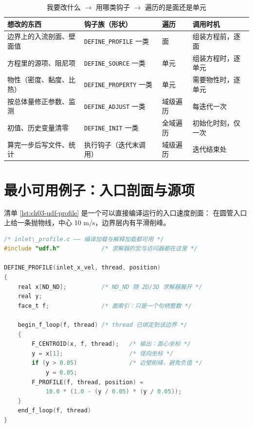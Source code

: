 \documentclass[12pt,a4paper,fontset=fandol]{ctexbook}
\newcommand{\Tp}[1]{\texttt{#1}}
\newcommand{\Bk}{\discretionary{}{}{}}
\begin{document}
\begin{table}[htbp]
\centering
\caption{我要改什么 $\rightarrow$ 用哪类钩子 $\rightarrow$ 遍历的是面还是单元}
\label{tab:ch03-hook-map}
\begin{tabular}{>{\raggedright\arraybackslash}p{} >{\raggedright\arraybackslash}p{} >{\raggedright\arraybackslash}p{} >{\raggedright\arraybackslash}p{}}
\toprule
想改的东西 & 钩子族（形状） & 遍历 & 调用时机 \\
\midrule
边界上的入流剖面、壁面值 & \Tp{DEFINE\_{\Bk}PROFILE} 一类 & 面 & 组装方程前，逐面 \\
方程里的源项、阻尼项 & \Tp{DEFINE\_SOURCE} 一类 & 单元 & 组装方程时，逐单元 \\
物性（密度、黏度、比热） & \Tp{DEFINE\_PROPERTY} 一类 & 单元 & 需要物性时，逐单元 \\
按总体量修正参数、监测 & \Tp{DEFINE\_{\Bk}ADJUST} 一类 & 域级遍历 & 每迭代一次 \\
初值、历史变量清零 & \Tp{DEFINE\_{\Bk}INIT} 一类 & 全域遍历 & 初始化时刻，仅一次 \\
算完一步后写文件、统计 & 执行钩子（迭代末调用） & 域级遍历 & 迭代结束处 \\
\bottomrule
\end{tabular}
\end{table}

\section{最小可用例子：入口剖面与源项}
\label{sec:ch03-examples}

清单 \ref{lst:ch03-udf-profile} 是一个可以直接编译运行的入口速度剖面：
在圆管入口上给一条抛物线，中心 10 m/s，边界层内有平滑削峰。

\begin{lstlisting}[language=C, style=cstyle, caption={UDF：入口速度剖面（面遍历 + F\_ 访问器）}, label={lst:ch03-udf-profile}]
/* inlet\_profile.c —— 编译加载与解释加载都可用 */
#include "udf.h"            /* 求解器的宏与访问器都在这里 */

DEFINE_PROFILE(inlet_x_vel, thread, position)
{
    real x[ND_ND];          /* ND_ND 随 2D/3D 求解器展开 */
    real y;
    face_t f;               /* 面索引：只是一个句柄整数 */

    begin_f_loop(f, thread) /* thread 已绑定到该边界 */
    {
        F_CENTROID(x, f, thread);   /* 输出：面心坐标 */
        y = x[1];                   /* 径向坐标 */
        if (y > 0.05)               /* 近壁削峰，避免负值 */
            y = 0.05;
        F_PROFILE(f, thread, position) =
            10.0 * (1.0 - (y / 0.05) * (y / 0.05));
    }
    end_f_loop(f, thread)
}
\end{lstlisting}
\end{document}
